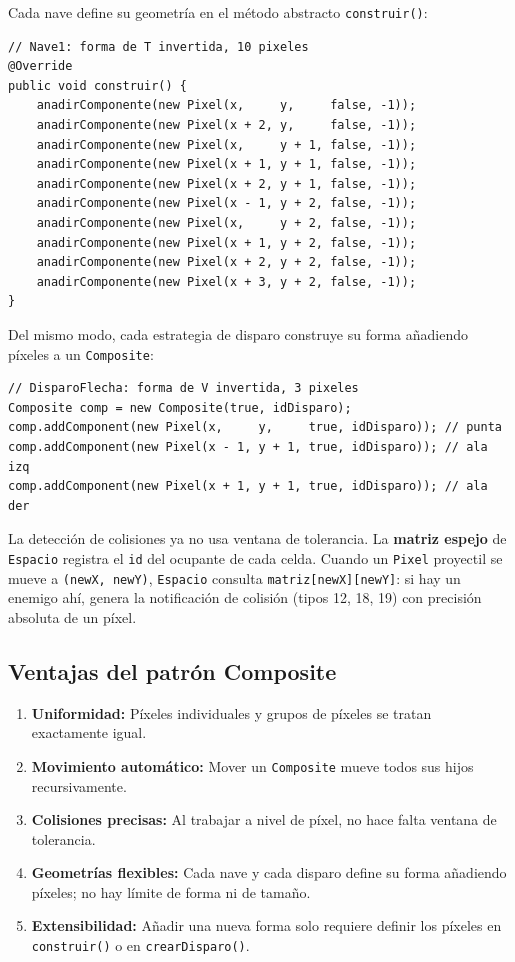 \documentclass[12pt, a4paper]{article}
\begin{document}
\begin{cajafinal}
Cada nave define su geometr\'{i}a en el m\'{e}todo abstracto \texttt{construir()}:
\begin{lstlisting}
// Nave1: forma de T invertida, 10 pixeles
@Override
public void construir() {
    anadirComponente(new Pixel(x,     y,     false, -1));
    anadirComponente(new Pixel(x + 2, y,     false, -1));
    anadirComponente(new Pixel(x,     y + 1, false, -1));
    anadirComponente(new Pixel(x + 1, y + 1, false, -1));
    anadirComponente(new Pixel(x + 2, y + 1, false, -1));
    anadirComponente(new Pixel(x - 1, y + 2, false, -1));
    anadirComponente(new Pixel(x,     y + 2, false, -1));
    anadirComponente(new Pixel(x + 1, y + 2, false, -1));
    anadirComponente(new Pixel(x + 2, y + 2, false, -1));
    anadirComponente(new Pixel(x + 3, y + 2, false, -1));
}
\end{lstlisting}
 
Del mismo modo, cada estrategia de disparo construye su forma a\~{n}adiendo p\'{i}xeles a un \texttt{Composite}:
\begin{lstlisting}
// DisparoFlecha: forma de V invertida, 3 pixeles
Composite comp = new Composite(true, idDisparo);
comp.addComponent(new Pixel(x,     y,     true, idDisparo)); // punta
comp.addComponent(new Pixel(x - 1, y + 1, true, idDisparo)); // ala izq
comp.addComponent(new Pixel(x + 1, y + 1, true, idDisparo)); // ala der
\end{lstlisting}
 
La detecci\'{o}n de colisiones ya no usa ventana de tolerancia. La \textbf{matriz espejo} de \texttt{Espacio} registra el \texttt{id} del ocupante de cada celda. Cuando un \texttt{Pixel} proyectil se mueve a \texttt{(newX, newY)}, \texttt{Espacio} consulta \texttt{matriz[newX][newY]}: si hay un enemigo ah\'{i}, genera la notificaci\'{o}n de colisi\'{o}n (tipos 12, 18, 19) con precisi\'{o}n absoluta de un p\'{i}xel.
\end{cajafinal}
 
\subsection{Ventajas del patr\'{o}n Composite}
 
\begin{enumerate}
    \item \textbf{Uniformidad:} P\'{i}xeles individuales y grupos de p\'{i}xeles se tratan exactamente igual.
    \item \textbf{Movimiento autom\'{a}tico:} Mover un \texttt{Composite} mueve todos sus hijos recursivamente.
    \item \textbf{Colisiones precisas:} Al trabajar a nivel de p\'{i}xel, no hace falta ventana de tolerancia.
    \item \textbf{Geometr\'{i}as flexibles:} Cada nave y cada disparo define su forma a\~{n}adiendo p\'{i}xeles; no hay l\'{i}mite de forma ni de tama\~{n}o.
    \item \textbf{Extensibilidad:} A\~{n}adir una nueva forma solo requiere definir los p\'{i}xeles en \texttt{construir()} o en \texttt{crearDisparo()}.
\end{enumerate}
 
\end{document}
